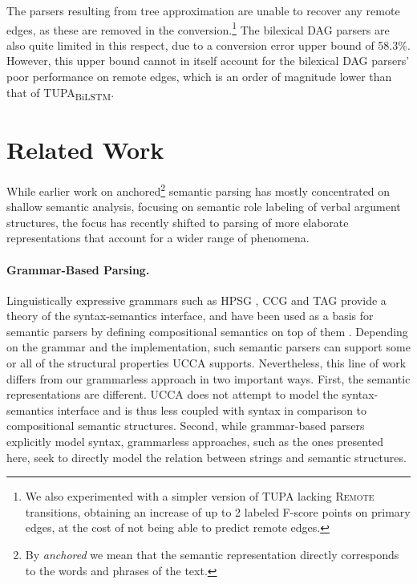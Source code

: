 \documentclass[11pt,a4paper]{article}
\newcommand{\parser}[1]{TUPA\textsubscript{#1}}
\begin{document}
The parsers resulting from tree approximation are unable to recover any remote edges,
as these are removed in the conversion.\footnote{We
also experimented with a simpler version of \parser{} lacking
\textsc{Remote} transitions, obtaining an increase of up to 2 labeled F-score
points on primary edges, at the cost of not being able to predict remote edges.}
The bilexical DAG parsers are also quite limited in this respect,
due to a conversion error upper bound of 58.3\%.
However, this upper bound cannot in itself account for the bilexical DAG parsers'
poor performance on remote edges, which is an order of magnitude lower than that
of \parser{BiLSTM}.







\section{Related Work}\label{sec:related_work}

While earlier work on anchored\footnote{By {\it anchored} we mean that the semantic representation
directly corresponds to the words and phrases of the text.}
semantic parsing has mostly concentrated on shallow semantic analysis,
focusing on semantic role labeling of verbal argument structures,
the focus has recently shifted to parsing of more elaborate representations that account
for a wider range of phenomena.

\paragraph{Grammar-Based Parsing.}
Linguistically expressive grammars such as HPSG \cite{PandS:94}, CCG \cite{Steedman:00} and TAG \cite{Joshi:97}
provide a theory of the syntax-semantics interface, and have been used as a basis for semantic parsers
by defining compositional semantics on top of them \cite[among others]{Flic:00,bos2005towards}.
Depending on the grammar and the implementation, such semantic parsers can support
some or all of the structural properties UCCA supports.
Nevertheless, this line of work differs from our grammarless approach in two important ways.
First, the semantic representations are different. UCCA does not attempt to model
the syntax-semantics interface and is thus less coupled with syntax in comparison to
compositional semantic structures.
Second, while grammar-based parsers explicitly model syntax, grammarless
approaches, such as the ones presented here, seek to directly model the relation between
strings and semantic structures.
\end{document}
